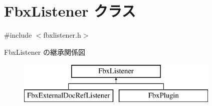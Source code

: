 \hypertarget{class_fbx_listener}{}\section{Fbx\+Listener クラス}
\label{class_fbx_listener}


{\ttfamily \#include $<$fbxlistener.\+h$>$}

Fbx\+Listener の継承関係図\begin{figure}[H]
\begin{center}
\leavevmode
\includegraphics[height=2.000000cm]{class_fbx_listener}
\end{center}
\end{figure}
